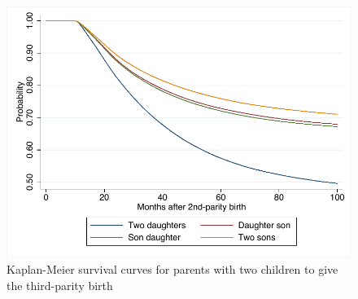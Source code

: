 \begin{figure}[]

    \includegraphics[width=0.6\columnwidth]{figures/probability-no-3rd-birth-survival.pdf}

    \caption{Kaplan-Meier survival curves for parents with two children to give the third-parity birth}
    \label{fig:probability-no-3rd-birth-survival}
\end{figure}


